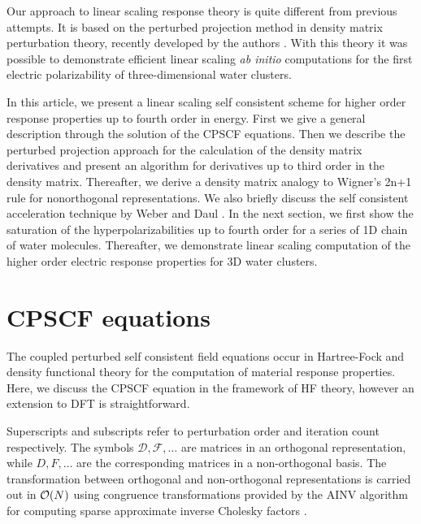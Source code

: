 \documentclass[prl,aps,twocolumn,showpacs,twocolumngrid,superbib]{revtex4}
\begin{document}
 Our approach to linear scaling response theory is quite different 
 from previous attempts. It is based on the perturbed projection
 method in density matrix perturbation theory, recently developed
 by the authors \cite{Niklasson04,Weber04}. With this theory it
 was possible to demonstrate efficient linear scaling {\em ab initio}
 computations for the first electric polarizability of three-dimensional 
 water clusters.

 In this article, we present a linear scaling self consistent scheme
 for higher order response properties up to fourth order in energy.
 First we give a general description through the solution of the CPSCF equations.
 Then we describe the perturbed projection approach for the calculation
 of the density matrix derivatives and present
 an algorithm for derivatives up to third order in the density matrix.
 Thereafter, we derive a density matrix analogy to Wigner's 2n+1
 rule for nonorthogonal representations. We also briefly discuss the
 self consistent acceleration technique by Weber and Daul \cite{Weber_2003} . In the next section,
 we first show the saturation of the hyperpolarizabilities up to fourth order
 for a series of 1D chain of water molecules. Thereafter, we demonstrate
 linear scaling computation of the higher order electric response properties
 for 3D water clusters.


\section{CPSCF equations}
The coupled perturbed self consistent field equations occur in Hartree-Fock
and density functional theory for the computation of material response
properties. Here, we discuss the CPSCF equation in the framework of
HF theory, however an extension to DFT is straightforward.

Superscripts and subscripts refer to perturbation order and 
iteration count respectively. The symbols $\mathcal{D},\mathcal{F},\dots$
are matrices in an orthogonal representation, while
$D,F,\dots$ are the corresponding matrices in a non-orthogonal basis.
The transformation between orthogonal and non-orthogonal 
representations is carried out in ${\cal O}(N)$ using
congruence transformations \cite{JWilkinson65,GStewart73} provided 
by the AINV algorithm for computing sparse approximate inverse 
Cholesky factors \cite{MBenzi95,MBenzi96,MBenzi01}.
\end{document}
